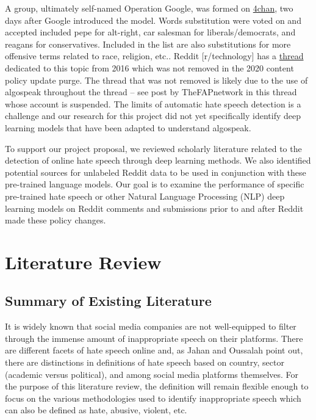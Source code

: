 \documentclass[conference]{IEEEtran}
\begin{document}
A group, ultimately self-named Operation Google, was formed on \href{https://archive.4plebs.org/pol/thread/89784922}{4chan}, two days after Google introduced the model\cite{b8}. Words substitution were voted on and accepted included pepe for alt-right, car salesman for liberals/democrats, and reagans for conservatives. Included in the list are also substitutions for more offensive terms related to race, religion, etc.\cite{b8}. Reddit [r/technology] has a \href{https://www.reddit.com/r/technology/comments/543a1q/4chan_and_pol_are_launching_operation_google/}{thread} dedicated to this topic\cite{b9} from 2016 which was not removed in the 2020 content policy update purge. The thread that was not removed is likely due to the use of algospeak throughout the thread -- see post by TheFAPnetwork in this thread whose account is suspended. The limits of automatic hate speech detection is a challenge and our research for this project did not yet specifically identify deep learning models that have been adapted to understand algospeak. 

To support our project proposal, we reviewed scholarly literature related to the detection of online hate speech through deep learning methods. We also identified potential sources for unlabeled Reddit data to be used in conjunction with these pre-trained language models. Our goal is to examine the performance of specific pre-trained hate speech or other Natural Language Processing (NLP) deep learning models on Reddit comments and submissions prior to and after Reddit made these policy changes.  

\section{Literature Review}

\subsection{Summary of Existing Literature}

It is widely known that social media companies are not well-equipped to filter through the immense amount of inappropriate speech on their platforms. There are different facets of hate speech online and, as Jahan and Oussalah\cite{b10} point out, there are distinctions in definitions of hate speech based on country, sector (academic versus political), and among social media platforms themselves. For the purpose of this literature review, the definition will remain flexible enough to focus on the various methodologies used to identify inappropriate speech which can also be defined as hate, abusive, violent, etc. 
\end{document}
